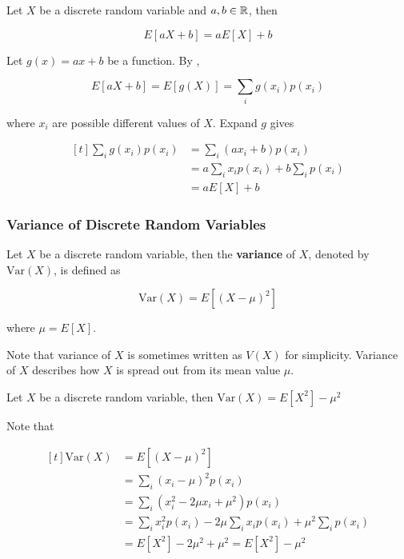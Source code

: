 \documentclass[a4paper,12pt]{article}
\begin{document}
\begin{crl}
  Let $X$ be a discrete random variable and $a,b\in\mathbb{R}$, then
  
  $$E[aX+b]=aE[X]+b$$\s

  \prf Let $g(x)=ax+b$ be a function. By \rpst[\sctd{0}],

  $$E[aX+b]=E[g(X)]=\sum_{i}g(x_{i})p(x_{i})$$\s

  where $x_{i}$ are possible different values of $X$. Expand $g$ gives

  $$\begin{aligned}[t]
    \sum_{i}g(x_{i})p(x_{i})&=\sum_{i}(ax_{i}+b)p(x_{i})\\
    &=a\sum_{i}x_{i}p(x_{i})+b\sum_{i}p(x_{i})\\
    &=aE[X]+b
  \end{aligned}$$
\end{crl}

\subsubsection{Variance of Discrete Random Variables}
\begin{dft}
  Let $X$ be a discrete random variable, then the \textbf{variance} of $X$, denoted by $\mathrm{Var}(X)$, is defined as

  $$\mathrm{Var}(X)=E[(X-\mu)^{2}]$$\s

  where $\mu=E[X]$.
\end{dft}\n

Note that variance of $X$ is sometimes written as $V(X)$ for simplicity. Variance of $X$ describes how $X$ is spread out from its mean value $\mu$.\n

\begin{pst}
  Let $X$ be a discrete random variable, then $\mathrm{Var}(X)=E[X^{2}]-\mu^{2}$\n

  \prf Note that
  
  $$\begin{aligned}[t]
    \mathrm{Var}(X)&=E[(X-\mu)^{2}]\\
    &=\sum_{i}(x_{i}-\mu)^{2}p(x_{i})\\
    &=\sum_{i}(x_{i}^{2}-2\mu x_{i}+\mu^{2})p(x_{i})\\
    &=\sum_{i}x_{i}^{2}p(x_{i})-2\mu\sum_{i}x_{i}p(x_{i})+\mu^{2}\sum_{i}p(x_{i})\\
    &=E[X^{2}]-2\mu^{2}+\mu^{2}=E[X^{2}]-\mu^{2}
  \end{aligned}$$
\end{pst}\n
\end{document}
